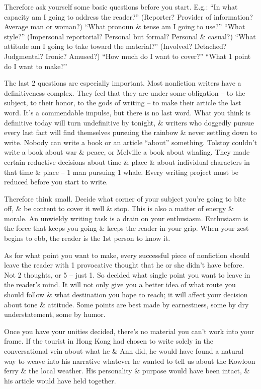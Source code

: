\documentclass{article}
\begin{document}
Therefore ask yourself some basic questions before you start. E.g.: ``In what capacity am I going to address the reader?'' (Reporter? Provider of information? Average man or woman?) ``What pronoun \& tense am I going to use?'' ``What style?'' (Impersonal reportorial? Personal but formal? Personal \& casual?) ``What attitude am I going to take toward the material?'' (Involved? Detached? Judgmental? Ironic? Amused?) ``How much do I want to cover?'' ``What 1 point do I want to make?''

The last 2 questions are especially important. Most nonfiction writers have a definitiveness complex. They feel that they are under some obligation -- to the subject, to their honor, to the gods of writing -- to make their article the last word. It's a commendable impulse, but there is no last word. What you think is definitive today will turn undefinitive by tonight, \& writers who doggedly pursue every last fact will find themselves pursuing the rainbow \& never settling down to write. Nobody can write a book or an article ``about'' something. Tolstoy couldn't write a book about war \& peace, or Melville a book about whaling. They made certain reductive decisions about time \& place \& about individual characters in that time \& place -- 1 man pursuing 1 whale. Every writing project must be reduced before you start to write.

Therefore think small. Decide what corner of your subject you're going to bite off, \& be content to cover it well \& stop. This is also a matter of energy \& morale. An unwieldy writing task is a drain on your enthusiasm. Enthusiasm is the force that keeps you going \& keeps the reader in your grip. When your zest begins to ebb, the reader is the 1st person to know it.

As for what point you want to make, every successful piece of nonfiction should leave the reader with 1 provocative thought that he or she didn't have before. Not 2 thoughts, or 5 -- just 1. So decided what single point you want to leave in the reader's mind. It will not only give you a better idea of what route you should follow \& what destination you hope to reach; it will affect your decision about tone \& attitude. Some points are best made by earnestness, some by dry understatement, some by humor.

Once you have your unities decided, there's no material you can't work into your frame. If the tourist in Hong Kong had chosen to write solely in the conversational vein about what he \& Ann did, he would have found a natural way to weave into his narrative whatever he wanted to tell us about the Kowloon ferry \& the local weather. His personality \& purpose would have been intact, \& his article would have held together.
\end{document}
